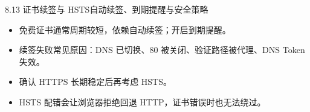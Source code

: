 \begin{frame}{8.13 证书续签与 HSTS}{自动续签、到期提醒与安全策略}
  \begin{itemize}
    \item 免费证书通常周期较短，依赖自动续签；开启到期提醒。
    \item 续签失败常见原因：DNS 已切换、80 被关闭、验证路径被代理、DNS Token 失效。
    \item 确认 HTTPS 长期稳定后再考虑 HSTS。
    \item HSTS 配错会让浏览器拒绝回退 HTTP，证书错误时也无法绕过。
  \end{itemize}
\end{frame}
